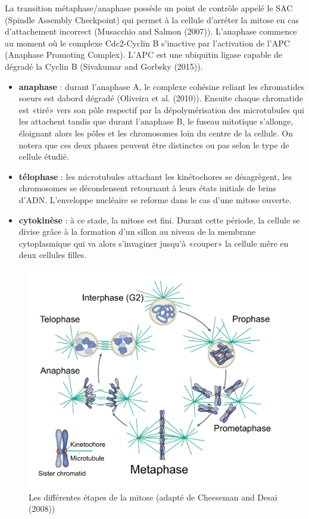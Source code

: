 \documentclass[12pt,a4paper,twoside,openright]{book}
\begin{document}
La transition métaphase/anaphase possède un point de contrôle appelé le
SAC (Spindle Assembly Checkpoint) qui permet à la cellule d'arréter la
mitose en cas d'attachement incorrect (Musacchio and Salmon (2007)).
L'anaphase commence au moment où le complexe Cdc2-Cyclin B s'inactive
par l'activation de l'APC (Anaphase Promoting Complex). L'APC est une
ubiquitin ligase capable de dégradé la Cyclin B (Sivakumar and Gorbsky
(2015)).

\begin{itemize}
\item
  \textbf{anaphase} : durant l'anaphase A, le complexe cohésine reliant
  les chromatides soeurs est dabord dégradé (Oliveira et al. (2010)).
  Ensuite chaque chromatide est «tiré» vers son pôle respectif par la
  dépolymérisation des microtubules qui les attachent tandis que durant
  l'anaphase B, le fuseau mitotique s'allonge, éloignant alors les pôles
  et les chromosomes loin du centre de la cellule. On notera que ces
  deux phases peuvent être distinctes ou pas selon le type de cellule
  étudié.
\item
  \textbf{télophase} : les microtubules attachant les kinétochores se
  désagrègent, les chromosomes se décondensent retournant à leurs états
  initials de brins d'ADN. L'enveloppe nucléaire se reforme dans le cas
  d'une mitose ouverte.
\item
  \textbf{cytokinèse} : à ce stade, la mitose est fini. Durant cette
  période, la cellule se divise grâce à la formation d'un sillon au
  niveau de la membrane cytoplasmique qui va alors s'invaginer jusqu'à
  «couper» la cellule mêre en deux cellules filles.
\end{itemize}

\begin{figure}[htbp]
\centering
\includegraphics{figures/intro/mitosis.png}
\caption{Les différentes étapes de la mitose (adapté de Cheeseman and
Desai (2008)) \label{mitosis}}
\end{figure}
\end{document}
